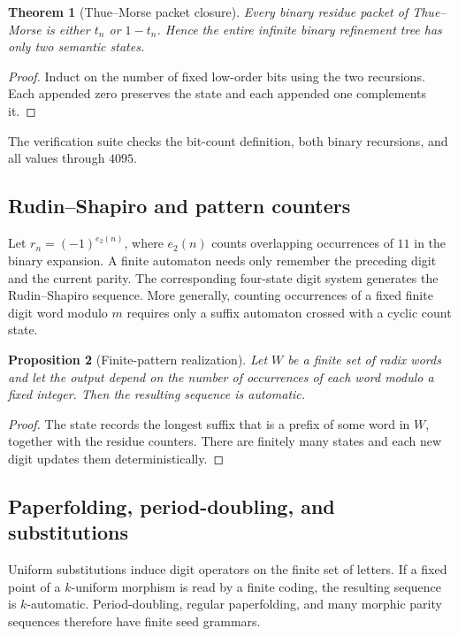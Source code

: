 \documentclass[11pt]{article}
\newtheorem{theorem}{Theorem}[section]\newtheorem{proposition}[theorem]{Proposition}\newtheorem{lemma}[theorem]{Lemma}\newtheorem{corollary}[theorem]{Corollary}
\theoremstyle{definition}\newtheorem{definition}[theorem]{Definition}\newtheorem{example}[theorem]{Example}\newtheorem{construction}[theorem]{Construction}\newtheorem{algorithm}[theorem]{Algorithm}\newtheorem{conjecture}[theorem]{Conjecture}\newtheorem{problem}[theorem]{Problem}
\theoremstyle{remark}\newtheorem{remark}[theorem]{Remark}\newtheorem{boundary}[theorem]{Boundary}\newtheorem{certificate}[theorem]{Computational Certificate}\newtheorem{classical}[theorem]{Classical Input}\newtheorem{principle}[theorem]{Structural Principle}
\begin{document}
\begin{theorem}[Thue--Morse packet closure]
Every binary residue packet of Thue--Morse is either $t_n$ or $1-t_n$.  Hence the entire infinite binary refinement tree has only two semantic states.
\end{theorem}
\begin{proof}
Induct on the number of fixed low-order bits using the two recursions.  Each appended zero preserves the state and each appended one complements it.
\end{proof}

The verification suite checks the bit-count definition, both binary recursions, and all values through $4095$.

\subsection{Rudin--Shapiro and pattern counters}
Let $r_n=(-1)^{e_2(n)}$, where $e_2(n)$ counts overlapping occurrences of $11$ in the binary expansion.  A finite automaton needs only remember the preceding digit and the current parity.  The corresponding four-state digit system generates the Rudin--Shapiro sequence.  More generally, counting occurrences of a fixed finite digit word modulo $m$ requires only a suffix automaton crossed with a cyclic count state.

\begin{proposition}[Finite-pattern realization]
Let $W$ be a finite set of radix words and let the output depend on the number of occurrences of each word modulo a fixed integer.  Then the resulting sequence is automatic.
\end{proposition}
\begin{proof}
The state records the longest suffix that is a prefix of some word in $W$, together with the residue counters.  There are finitely many states and each new digit updates them deterministically.
\end{proof}

\subsection{Paperfolding, period-doubling, and substitutions}
Uniform substitutions induce digit operators on the finite set of letters.  If a fixed point of a $k$-uniform morphism is read by a finite coding, the resulting sequence is $k$-automatic.  Period-doubling, regular paperfolding, and many morphic parity sequences therefore have finite seed grammars.
\end{document}
